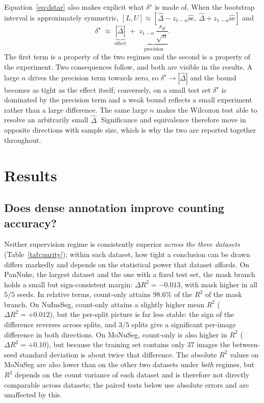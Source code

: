 \documentclass[preprint,12pt]{elsarticle}
\begin{document}
Equation~\eqref{eq:dstar} also makes explicit what $\delta^\star$ is made of. When the bootstrap interval is
approximately symmetric, $[L,U] \approx [\hat{\Delta} - z_{1-\alpha}\widehat{\mathrm{se}},\
\hat{\Delta} + z_{1-\alpha}\widehat{\mathrm{se}}]$ and
\begin{equation}\label{eq:dstardecomp}
\delta^\star \;\approx\; \underbrace{|\hat{\Delta}|}_{\text{effect}} \;+\;
\underbrace{z_{1-\alpha}\,\frac{s_d}{\sqrt{n}}}_{\text{precision}} .
\end{equation}
The first term is a property of the two regimes and the second is a property of the experiment. Two
consequences follow, and both are visible in the results. A large $n$ drives the precision term towards zero,
so $\delta^\star \to |\hat{\Delta}|$ and the bound becomes as tight as the effect itself; conversely, on a
small test set $\delta^\star$ is dominated by the precision term and a weak bound reflects a small experiment
rather than a large difference. The same large $n$ makes the Wilcoxon test able to resolve an arbitrarily small
$\hat{\Delta}$. Significance and equivalence therefore move in opposite directions with sample size, which is
why the two are reported together throughout.

\section{Results}\label{sec:results}

\subsection{Does dense annotation improve counting accuracy?}\label{sec:parity}

Neither supervision regime is consistently superior \emph{across the three datasets}
(Table~\ref{tab:parity}); within each dataset, how tight a conclusion can be drawn differs markedly and depends
on the statistical power that dataset affords. On PanNuke, the largest dataset and the one with a fixed test
set, the mask branch holds a small but sign-consistent margin: $\Delta R^2 = -0.013$, with mask higher in all
$5/5$ seeds. In relative terms, count-only attains $98.6\%$ of the $R^2$ of the mask branch. On NuInsSeg,
count-only attains a slightly higher mean $R^2$ ($\Delta R^2 = +0.012$), but the per-split picture is far less
stable: the sign of the difference reverses across splits, and $3/5$ splits give a significant per-image
difference in both directions. On MoNuSeg, count-only is also higher in $R^2$ ($\Delta R^2 = +0.10$), but
because the training set contains only $37$ images the between-seed standard deviation is about twice that
difference. The absolute $R^2$ values on MoNuSeg are also lower than on the other two datasets under
\emph{both} regimes, but $R^2$ depends on the count variance of each dataset and is therefore not directly
comparable across datasets; the paired tests below use absolute errors and are unaffected by this.
\end{document}
